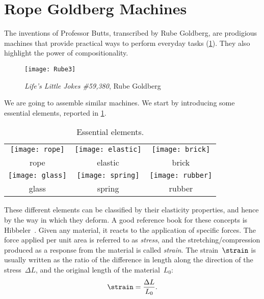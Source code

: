 

\section{Rope Goldberg Machines}

The inventions of Professor Butts, transcribed by Rube Goldberg, are prodigious machines that provide practical ways to perform everyday tasks (\cref{fig:Rube3}). They also highlight the power of compositionality.

\begin{figure}[h]
  \texttt{[image: Rube3]}
  \caption{\emph{Life’s Little Jokes \#59,380}, Rube Goldberg}
  \label{fig:Rube3}
\end{figure}



We are going to assemble similar machines. We start by introducing some essential elements, reported in \cref{tab:basic_els}.

\begin{table}[h]
\begin{center}
\begin{tabular}{ccc}
   \texttt{[image: rope]}&
  \texttt{[image: elastic]}&
  \texttt{[image: brick]}\\
  rope&elastic&brick\\[+10pt]
  \texttt{[image: glass]}&
  \texttt{[image: spring]}&
  \texttt{[image: rubber]}\\
  glass&spring&rubber
\end{tabular}
\end{center}
  \caption{Essential elements. \label{tab:basic_els}}
\end{table}

These different elements can be classified by their elasticity properties, and hence by the way in which they deform.
A good reference book for these concepts is Hibbeler~\cite{hibbeler2014mechanics}.
Given any material, it reacts to the application of specific forces. The force applied per unit area is referred to as \emph{stress}, and the stretching/compression produced as a response from the material is called \emph{strain}.
The strain~$\strain$ is usually written as the ratio of the difference in length along the direction of the stress~$\Delta L$, and the original length of the material~$L_0$:
\begin{equation*}
  \strain = \frac{\Delta L}{L_0}.
\end{equation*}

